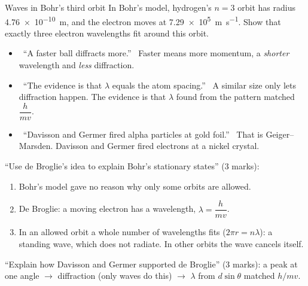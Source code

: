 \begin{workedexample}{Waves in Bohr's third orbit}\label{ch3:we:third}
In Bohr's model, hydrogen's $n = 3$ orbit has radius \qty{4.76e-10}{m}, and the electron moves
at \qty{7.29e5}{m.s^{-1}}. Show that exactly three electron wavelengths fit around this orbit.
\end{workedexample}

\begin{mistakes}
\begin{itemize}
  \item \xmark\ ``A faster ball diffracts more.'' \cmark\ Faster means more momentum, a
        \emph{shorter} wavelength and \emph{less} diffraction.
  \item \xmark\ ``The evidence is that $\lambda$ equals the atom spacing.'' \cmark\ A similar
        size only lets diffraction happen. The evidence is that $\lambda$ found from the
        pattern matched $\dfrac{h}{mv}$.
  \item \xmark\ ``Davisson and Germer fired alpha particles at gold foil.'' \cmark\ That is
        Geiger--Marsden. Davisson and Germer fired electrons at a nickel crystal.
\end{itemize}
\end{mistakes}

\begin{examtip}
``Use de Broglie's idea to explain Bohr's stationary states'' (3 marks):
\begin{enumerate}
  \item Bohr's model gave no reason why only some orbits are allowed.
  \item De Broglie: a moving electron has a wavelength, $\lambda = \dfrac{h}{mv}$.
  \item In an allowed orbit a whole number of wavelengths fits ($2\pi r = n\lambda$): a
        standing wave, which does not radiate. In other orbits the wave cancels itself.
\end{enumerate}
``Explain how Davisson and Germer supported de Broglie'' (3 marks): a peak at one angle
$\to$ diffraction (only waves do this) $\to$ $\lambda$ from $d\sin\theta$ matched $h/mv$.
\end{examtip}

